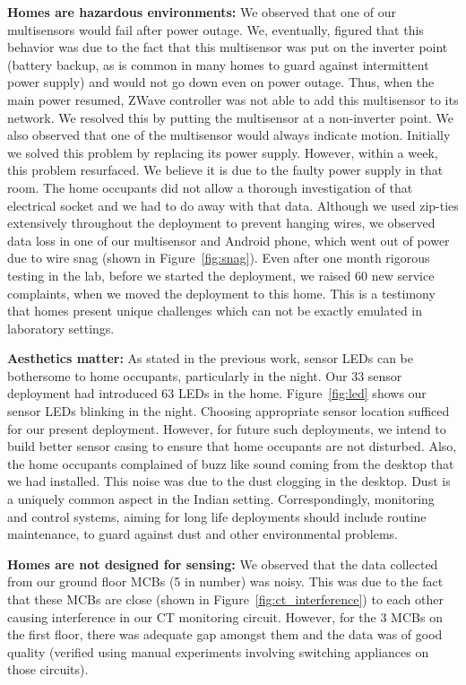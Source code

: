 \documentclass[10pt]{sensys-proc}
\newcommand{\figref}[1]{Figure~\ref{#1}}
\begin{document}
\noindent \textbf{Homes are hazardous environments:} We observed that one of our multisensors would fail after power outage. %
We, eventually, figured that this behavior was due to the fact that this multisensor was put on the inverter point (battery backup, as is common in many homes to guard against intermittent power supply) and would not go down even on power outage. Thus, when the main power resumed, ZWave controller was not able to add this multisensor to its network. We resolved this by putting the multisensor at a non-inverter point. We also observed that one of the multisensor would always indicate motion. Initially we solved this problem by replacing its power supply. However, within a week, this problem resurfaced. We believe it is due to the faulty power supply in that room. The home occupants did not allow a thorough investigation of that electrical socket and we had to do away with that data.
Although we used zip-ties extensively throughout the deployment to prevent hanging wires, we observed data loss in one of our multisensor and Android phone, which went out of power due to wire snag (shown in \figref{fig:snag}). Even after one month rigorous testing in the lab, before we started the deployment, we raised 60 new service complaints, when we moved the deployment to this home. This is a testimony that homes present unique challenges which can not be exactly emulated in laboratory settings.

\noindent \textbf{Aesthetics matter:} As stated in the previous work, sensor LEDs can be bothersome to home occupants, particularly in the night. Our 33 sensor deployment had introduced 63 LEDs in the home. \figref{fig:led} shows our sensor LEDs blinking in the night. Choosing appropriate sensor location sufficed for our present deployment. However, for future such deployments, we intend to build better sensor casing to ensure that home occupants are not disturbed. Also, the home occupants complained of buzz like sound coming from the desktop that we had installed. This noise was due to the dust clogging in the desktop. Dust is a uniquely common aspect in the Indian setting. Correspondingly, {monitoring and control systems, aiming for long life deployments should include routine maintenance, to guard against dust and other environmental problems.}

\noindent \textbf{Homes are not designed for sensing:} We observed that the data collected from our ground floor MCBs (5 in number) was noisy. This was due to the fact that these MCBs are close (shown in \figref{fig:ct_interference}) to each other causing interference in our CT monitoring circuit. However, for the 3 MCBs on the first floor, there was adequate gap amongst them and the data was of good quality (verified using manual experiments involving switching appliances on those circuits). %
\end{document}
